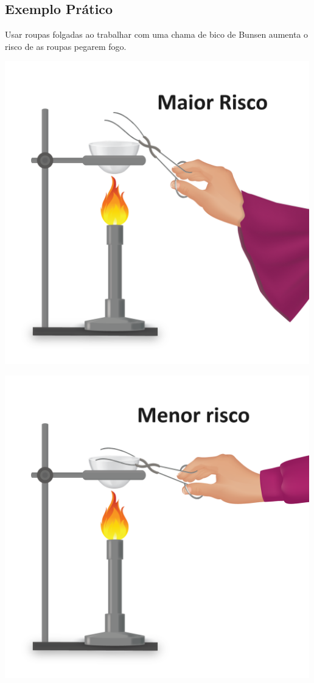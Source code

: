 \documentclass[
  letterpaper,
  DIV=11,
  numbers=noendperiod]{scrartcl}
\begin{document}
\subsection{Exemplo Prático}\label{exemplo-pruxe1tico}

Usar roupas folgadas ao trabalhar com uma chama de bico de Bunsen
aumenta o risco de as roupas pegarem fogo.

\includegraphics[width=5.20833in,height=\textheight,keepaspectratio]{imagens/image_3.27e26638.png}

\includegraphics[width=5.20833in,height=\textheight,keepaspectratio]{imagens/image_4.b26a4074.png}
\end{document}
